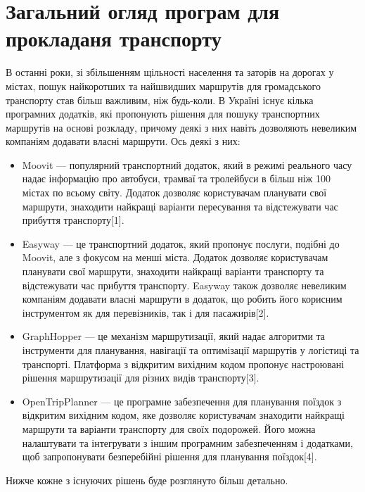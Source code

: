 \section{Загальний огляд програм для прокладаня транспорту}
\label{sec:existing-sulutions}

В останні роки, зі збільшенням щільності населення та заторів на дорогах у містах, пошук найкоротших та найшвидших маршрутів для громадського транспорту став більш важливим, ніж будь-коли. В Україні існує кілька програмних додатків, які пропонують рішення для пошуку транспортних маршрутів на основі розкладу, причому деякі з них навіть дозволяють невеликим компаніям додавати власні маршрути. Ось деякі з них:


\begin{itemize}
  \item Moovit --- популярний транспортний додаток, який в режимі реального часу надає інформацію про автобуси, трамваї та тролейбуси в більш ніж 100 містах по всьому світу. Додаток дозволяє користувачам планувати свої маршрути, знаходити найкращі варіанти пересування та відстежувати час прибуття транспорту[1].

  \item Easyway --- це транспортний додаток, який пропонує послуги, подібні до Moovit, але з фокусом на менші міста. Додаток дозволяє користувачам планувати свої маршрути, знаходити найкращі варіанти транспорту та відстежувати час прибуття транспорту. Easyway також дозволяє невеликим компаніям додавати власні маршрути в додаток, що робить його корисним інструментом як для перевізників, так і для пасажирів[2].

  \item GraphHopper ---  це механізм маршрутизації, який надає алгоритми та інструменти для планування, навігації та оптимізації маршрутів у логістиці та транспорті. Платформа з відкритим вихідним кодом пропонує настроювані рішення маршрутизації для різних видів транспорту[3].

  \item OpenTripPlanner --- це програмне забезпечення для планування поїздок з відкритим вихідним кодом, яке дозволяє користувачам знаходити найкращі маршрути та варіанти транспорту для своїх подорожей. Його можна налаштувати та інтегрувати з іншим програмним забезпеченням і додатками, щоб запропонувати безперебійні рішення для планування поїздок[4].

\end{itemize}

Нижче кожне з існуючих рішень буде розглянуто більш детально.







